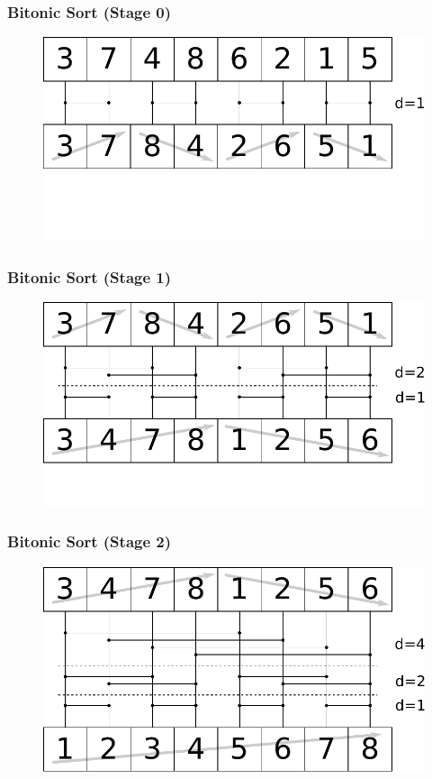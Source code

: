 \documentclass[aspectratio=169]{beamer}
\begin{document}
\frame
{
	\frametitle{Bitonic Sort (Stage 0)}
	\begin{figure}
		\centering
		\includegraphics[height=0.6\textheight]{bitonic0}
	\end{figure}
}

\frame
{
	\frametitle{Bitonic Sort (Stage 1)}
	\begin{figure}
		\centering
		\includegraphics[height=0.6\textheight]{bitonic1}
	\end{figure}
}

\frame
{
	\frametitle{Bitonic Sort (Stage 2)}
	\begin{figure}
		\centering
		\includegraphics[height=0.6\textheight]{bitonic2}
	\end{figure}
}
\end{document}
